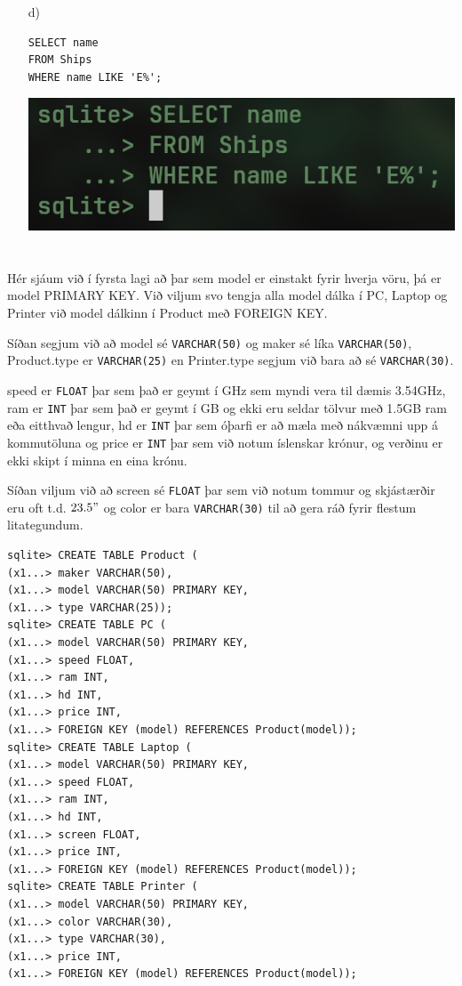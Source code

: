 \documentclass{article}
\begin{document}
\begin{itemize}
\begin{center}
			\end{center}
		\item[d)] 
			\begin{verbatim}
SELECT name
FROM Ships
WHERE name LIKE 'E%';
			\end{verbatim}
			\begin{center}
				\includegraphics[scale=0.375]{estart.png}
			\end{center}
	\end{itemize}

	\newpage
	\section{}
	Hér sjáum við í fyrsta lagi að þar sem model er einstakt fyrir hverja 
	vöru, þá er model PRIMARY KEY. Við viljum svo tengja alla model dálka 
	í PC, Laptop og Printer við model dálkinn í Product með FOREIGN KEY.

	Síðan segjum við að model sé \texttt{VARCHAR(50)} og maker sé líka 
	\texttt{VARCHAR(50)}, Product.type er \texttt{VARCHAR(25)} en 
	Printer.type segjum við bara að sé \texttt{VARCHAR(30)}.

	speed er \texttt{FLOAT} þar sem það er geymt í GHz sem myndi vera 
	til dæmis 3.54GHz, ram er \texttt{INT} þar sem það er geymt í GB og 
	ekki eru seldar tölvur með 1.5GB ram eða eitthvað lengur, 
	hd er \texttt{INT} þar sem óþarfi er að mæla með nákvæmni upp á 
	kommutöluna og price er \texttt{INT} þar sem við notum íslenskar 
	krónur, og verðinu er ekki skipt í minna en eina krónu.

	Síðan viljum við að screen sé \texttt{FLOAT} þar sem við notum tommur 
	og skjástærðir eru oft t.d. $23.5"$ og color er bara \texttt{VARCHAR(30)} 
	til að gera ráð fyrir flestum litategundum.

	\begin{verbatim}
sqlite> CREATE TABLE Product (
(x1...> maker VARCHAR(50),
(x1...> model VARCHAR(50) PRIMARY KEY,
(x1...> type VARCHAR(25));
sqlite> CREATE TABLE PC (
(x1...> model VARCHAR(50) PRIMARY KEY,
(x1...> speed FLOAT,
(x1...> ram INT,
(x1...> hd INT,
(x1...> price INT,
(x1...> FOREIGN KEY (model) REFERENCES Product(model));
sqlite> CREATE TABLE Laptop (
(x1...> model VARCHAR(50) PRIMARY KEY,
(x1...> speed FLOAT,
(x1...> ram INT,
(x1...> hd INT,
(x1...> screen FLOAT,
(x1...> price INT,
(x1...> FOREIGN KEY (model) REFERENCES Product(model));
sqlite> CREATE TABLE Printer (
(x1...> model VARCHAR(50) PRIMARY KEY,
(x1...> color VARCHAR(30),
(x1...> type VARCHAR(30),
(x1...> price INT,
(x1...> FOREIGN KEY (model) REFERENCES Product(model));
\end{verbatim}
\end{document}
